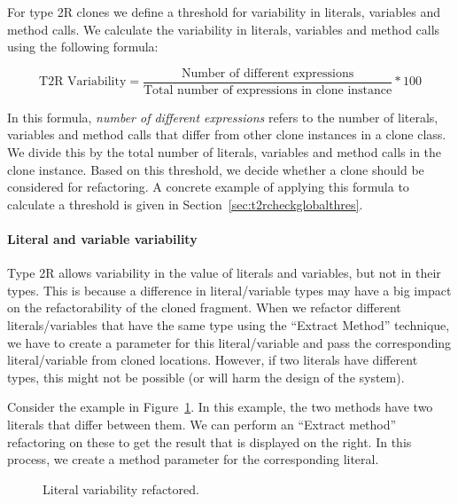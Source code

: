 For type 2R clones we define a threshold for variability in literals, variables and method calls. We calculate the variability in literals, variables and method calls using the following formula:

\begin{equation}\label{eq:type2r}
\text{T2R Variability}=\frac{\text{Number of different expressions}}{\text{Total number of expressions in clone instance}}*100
\end{equation}

In this formula, \textit{number of different expressions} refers to the number of literals, variables and method calls that differ from other clone instances in a clone class. We divide this by the total number of literals, variables and method calls in the clone instance. Based on this threshold, we decide whether a clone should be considered for refactoring. A concrete example of applying this formula to calculate a threshold is given in Section~\ref{sec:t2rcheckglobalthres}.

\paragraph{Literal and variable variability}\label{sec:t2rliteralandvariable}
Type 2R allows variability in the value of literals and variables, but not in their types. This is because a difference in literal/variable types may have a big impact on the refactorability of the cloned fragment. When we refactor different literals/variables that have the same type using the ``Extract Method'' technique, we have to create a parameter for this literal/variable and pass the corresponding literal/variable from cloned locations. However, if two literals have different types, this might not be possible (or will harm the design of the system). %

Consider the example in Figure~\ref{fig:type2literal}. In this example, the two methods have two literals that differ between them. We can perform an ``Extract method'' refactoring on these to get the result that is displayed on the right. In this process, we create a method parameter for the corresponding literal.

\begin{figure}[H]
\begin{parcolumns}{2}
\end{parcolumns}
\caption{Literal variability refactored.}
\label{fig:type2literal}
\end{figure}

